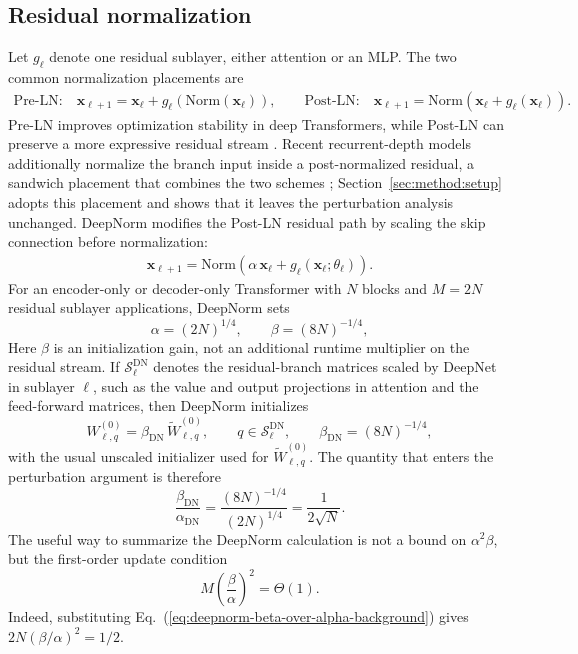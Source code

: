 \documentclass[11pt]{airesearch}
\begin{document}
\subsection{Residual normalization}
\label{sec:background:residual}

Let $g_\ell$ denote one residual sublayer, either attention or an MLP.
The two common normalization placements are
\begin{align*}
  \text{Pre-LN:}\quad
  \mathbf{x}_{\ell+1}
  = \mathbf{x}_\ell + g_\ell(\mathrm{Norm}(\mathbf{x}_\ell)),
  \qquad
  \text{Post-LN:}\quad
  \mathbf{x}_{\ell+1}
  = \mathrm{Norm}\left(\mathbf{x}_\ell + g_\ell(\mathbf{x}_\ell)\right).
\end{align*}
Pre-LN improves optimization stability in deep Transformers, while
Post-LN can preserve a more expressive residual stream
\citep{xiong2020layer,nguyen2019transformers}. Recent recurrent-depth models
additionally normalize the branch input inside a post-normalized residual, a
sandwich placement that combines the two schemes \citep{geiping2025scaling};
Section~\ref{sec:method:setup} adopts this placement and shows that it leaves
the perturbation analysis unchanged. DeepNorm
\citep{wang2024deepnet} modifies the Post-LN residual path by scaling
the skip connection before normalization:
\begin{align}
  \mathbf{x}_{\ell+1}
  = \mathrm{Norm}\left(\alpha\,\mathbf{x}_\ell
  + g_\ell(\mathbf{x}_\ell;\theta_\ell)\right).
\end{align}
For an encoder-only or decoder-only Transformer with $N$ blocks and
$M=2N$ residual sublayer applications, DeepNorm sets
\begin{equation}
  \alpha=(2N)^{1/4},
  \qquad
  \beta=(8N)^{-1/4},
  \label{eq:deepnorm-scales-background}
\end{equation}
Here $\beta$ is an initialization gain, not an additional runtime multiplier on
the residual stream. If $\mathcal{S}^{\mathrm{DN}}_\ell$ denotes the
residual-branch matrices scaled by DeepNet in sublayer $\ell$, such as the value
and output projections in attention and the feed-forward matrices, then
DeepNorm initializes
\begin{equation}
  W_{\ell,q}^{(0)}
  =
  \beta_{\mathrm{DN}}\,
  \widetilde W_{\ell,q}^{(0)},
  \qquad
  q\in\mathcal{S}^{\mathrm{DN}}_\ell,
  \qquad
  \beta_{\mathrm{DN}}=(8N)^{-1/4},
  \label{eq:deepnorm-beta-usage}
\end{equation}
with the usual unscaled initializer used for
$\widetilde W_{\ell,q}^{(0)}$. The quantity that enters the perturbation
argument is therefore
\begin{equation}
  \frac{\beta_{\mathrm{DN}}}{\alpha_{\mathrm{DN}}}
  =
  \frac{(8N)^{-1/4}}{(2N)^{1/4}}
  =
  \frac{1}{2\sqrt{N}}.
  \label{eq:deepnorm-beta-over-alpha-background}
\end{equation}
The useful way to summarize the DeepNorm calculation is not a bound on
$\alpha^2\beta$, but the first-order update condition
\begin{equation}
  M\left(\frac{\beta}{\alpha}\right)^2 = \Theta(1).
  \label{eq:deepnorm-condition-background}
\end{equation}
Indeed, substituting Eq.~(\ref{eq:deepnorm-beta-over-alpha-background}) gives
$2N(\beta/\alpha)^2=1/2$.
\end{document}
